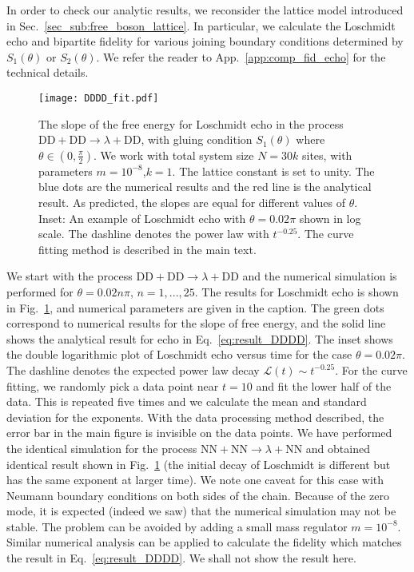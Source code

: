 In order to check our analytic results, we reconsider the lattice model introduced in Sec.~\ref{sec_sub:free_boson_lattice}. In particular, we calculate the Loschmidt echo and bipartite fidelity for various joining boundary conditions determined by $S_1(\theta)$ or $S_2(\theta)$. We refer the reader to App.~\ref{app:comp_fid_echo} for the technical details. 

\begin{figure}[h]
\texttt{[image: DDDD\_fit.pdf]}
\caption{The slope of the free energy for Loschmidt echo in the process $\text{DD}+\text{DD}\rightarrow\lambda+\text{DD}$, with gluing condition $S_1(\theta)$ where $\theta\in(0,\frac{\pi}{2})$. We work with total system size $N=30k$ sites, with parameters $m=10^{-8}$,$k=1$. The lattice constant is set to unity. The blue dots are the numerical results and the red line is the analytical result. As predicted, the slopes are equal for different values of $\theta$. Inset: An example of Loschmidt echo with $\theta=0.02\pi$ shown in log scale. The dashline denotes the power law with $t^{-0.25}$. The curve fitting method is described in the main text.}
\label{fig:DDDD}
\end{figure}

We start with the process $\text{DD}+\text{DD}\rightarrow\lambda+\text{DD}$ and the numerical simulation is performed for $\theta=0.02n\pi$, $n=1,...,25$. The results for Loschmidt echo is shown in Fig.~\ref{fig:DDDD}, and numerical parameters are given in the caption. The green dots correspond to numerical results for the slope of free energy, and the solid line shows the analytical result for echo in Eq.~\eqref{eq:result_DDDD}. The inset shows the double logarithmic plot of Loschmidt echo versus time for the case $\theta=0.02\pi$. The dashline denotes the expected power law decay $\mathcal{L}(t)\sim t^{-0.25}$. For the curve fitting, we randomly pick a data point near $t=10$ and fit the lower half of the data. This is repeated five times and we calculate the mean and standard deviation for the exponents. With the data processing method described, the error bar in the main figure is invisible on the data points. We have performed the identical simulation for the process $\text{NN}+\text{NN}\rightarrow\lambda+\text{NN}$ and obtained identical result shown in Fig.~\ref{fig:DDDD} (the initial decay of Loschmidt is different but has the same exponent at larger time). We note one caveat for this case with Neumann boundary conditions on both sides of the chain. Because of the zero mode, it is expected (indeed we saw) that the numerical simulation may not be stable. The problem can be avoided by adding a small mass regulator $m=10^{-8}$. Similar numerical analysis can be applied to calculate the fidelity which matches the result in Eq.~\eqref{eq:result_DDDD}. We shall not show the result here. 

